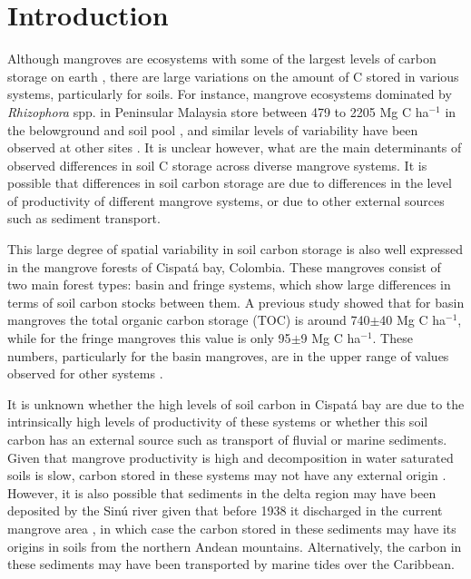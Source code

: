 \section{Introduction}
\label{intro}
Although mangroves are ecosystems with some of the largest levels of carbon storage on earth \citep{Donato2011, Alongi2012}, there are  large variations on the amount of C stored in various systems, particularly for soils. For instance, mangrove ecosystems dominated by \emph{Rhizophora} spp. in Peninsular Malaysia store between 479 to 2205 Mg C ha$^{-1}$ in the belowground and soil pool \citep{Alongi2012}, and similar levels of variability have been observed at other sites \citep{Jardine2014}. It is unclear however, what are the main determinants of observed differences in soil C storage across diverse mangrove systems. It is possible that differences in soil carbon storage are due to differences in the level of productivity of different mangrove systems, or due to other external sources such as sediment transport. 

This large degree of spatial variability in soil carbon storage is also well expressed in the mangrove forests of Cispat\'{a} bay, Colombia. These mangroves consist of two main forest types: basin and fringe systems, 
which show large differences in terms of soil carbon stocks between them. A previous study \citep{Bolivar2015} showed that for basin mangroves the total organic carbon storage (TOC) is around 740$\pm$40 Mg C ha$^{-1}$, while for the fringe mangroves this value is only 95$\pm$9 Mg C ha$^{-1}$. These numbers, particularly for the basin mangroves, are in the upper range of values observed for other systems \citep{Donato2011, Alongi2012, Jardine2014}. 

It is unknown whether the high levels of soil carbon in Cispat\'{a} bay are due to the intrinsically high levels of productivity of these systems or whether this soil carbon has an external source such as transport of fluvial or marine sediments.  Given that mangrove productivity is high and decomposition in water saturated soils is slow, carbon stored in these systems may not have any external origin \citep{lacerda}. However, it is also possible that sediments in the delta region may have been deposited by the Sin\'u river given that before 1938 it discharged in the current mangrove area \citep{suarez2004}, in which case the carbon stored in these sediments may have its origins in soils from the northern Andean mountains.  Alternatively, the carbon in these sediments may have been transported by marine tides over the Caribbean. 

